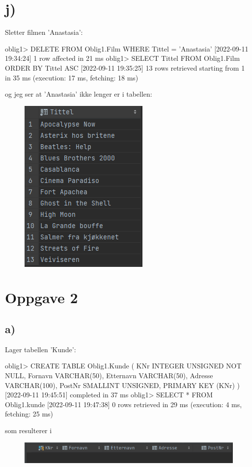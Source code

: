 \documentclass[%
notitlepage,
 amsmath,amssymb,
 aps,
rmp,
]{revtex4-2}  %
\begin{document}
\section*{j)}
Sletter filmen 'Anastasia':
\begin{sql}
oblig1> DELETE
        FROM Oblig1.Film
        WHERE Tittel = 'Anastasia'
[2022-09-11 19:34:24] 1 row affected in 21 ms
oblig1> SELECT Tittel
        FROM Oblig1.Film
        ORDER BY Tittel ASC
[2022-09-11 19:35:25] 13 rows retrieved starting from 1 in 35 ms (execution: 17 ms, fetching: 18 ms)
\end{sql}
\newpage
og jeg ser at 'Anastasia' ikke lenger er i tabellen:
\begin{figure}[H]
\centering\includegraphics[scale=1]{op1j.png}
\end{figure}

\section*{Oppgave 2}
\subsection*{a)}
Lager tabellen 'Kunde':
\begin{sql}
oblig1> CREATE TABLE Oblig1.Kunde (
            KNr INTEGER UNSIGNED NOT NULL,
            Fornavn VARCHAR(50),
            Etternavn VARCHAR(50),
            Adresse VARCHAR(100),
            PostNr SMALLINT UNSIGNED,
            PRIMARY KEY (KNr)
        )
[2022-09-11 19:45:51] completed in 37 ms
oblig1> SELECT *
        FROM Oblig1.kunde
[2022-09-11 19:47:38] 0 rows retrieved in 29 ms (execution: 4 ms, fetching: 25 ms)
\end{sql}
som resulterer i
\begin{figure}[H]
\centering\includegraphics[scale=1]{op2a.png}
\end{figure}
\end{document}
